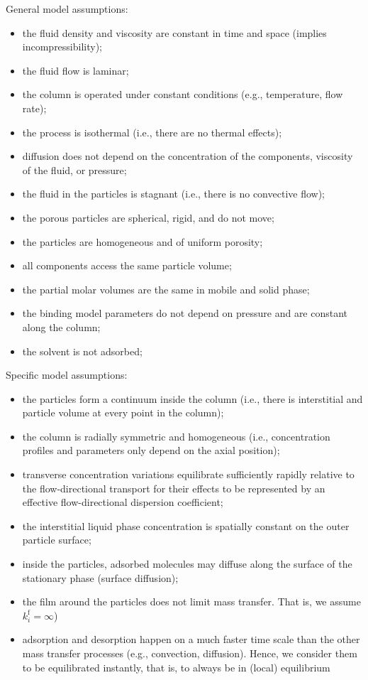 \documentclass{article}
\begin{document}
General model assumptions:
\begin{itemize}
    \item the fluid density and viscosity are constant in time and space (implies incompressibility);
    \item the fluid flow is laminar;
    \item the column is operated under constant conditions (e.g., temperature, flow rate);
    \item the process is isothermal (i.e., there are no thermal effects);
    \item diffusion does not depend on the concentration of the components, viscosity of the fluid, or pressure;
    \item the fluid in the particles is stagnant (i.e., there is no convective flow);
    \item the porous particles are spherical, rigid, and do not move;
    \item the particles are homogeneous and of uniform porosity;
    \item all components access the same particle volume;
    \item the partial molar volumes are the same in mobile and solid phase;
    \item the binding model parameters do not depend on pressure and are constant along the column;
    \item the solvent is not adsorbed;
\end{itemize}

Specific model assumptions:
\begin{itemize}
    \item the particles form a continuum inside the column (i.e., there is interstitial and particle volume at every point in the column);
    \item the column is radially symmetric and homogeneous (i.e., concentration profiles and parameters only depend on the axial position);
    \item transverse concentration variations equilibrate sufficiently rapidly relative to the flow-directional transport for their effects to be represented by an effective flow-directional dispersion coefficient;
    \item the interstitial liquid phase concentration is spatially constant on the outer particle surface;
    \item inside the particles, adsorbed molecules may diffuse along the surface of the stationary phase (surface diffusion);
    \item the film around the particles does not limit mass transfer. That is, we assume $k^{\mathrm{f}}_{i} = \infty$)
    \item adsorption and desorption happen on a much faster time scale than the other mass transfer processes (e.g., convection, diffusion). Hence, we consider them to be equilibrated instantly, that is, to always be in (local) equilibrium
\end{itemize}
\end{document}
